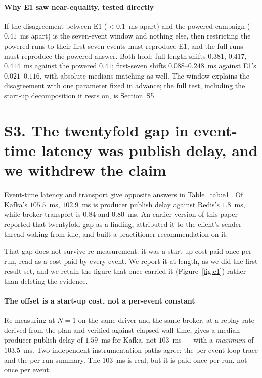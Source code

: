 \documentclass[10pt,journal,onecolumn]{IEEEtran}
\newcommand{\kafka}{Kafka}
\newcommand{\redis}{Redis}
\begin{document}
\paragraph{Why E1 saw near-equality, tested directly} If the disagreement between E1
($<0.1$~ms apart) and the powered campaign ($0.41$~ms apart) is the seven-event window and
nothing else, then restricting the powered runs to their first seven events must reproduce E1,
and the full runs must reproduce the powered answer. Both hold: full-length shifts $0.381$,
$0.417$, $0.414$~ms against the powered $0.41$; first-seven shifts $0.088$--$0.248$~ms against
E1's $0.021$--$0.116$, with absolute medians matching as well. The window explains the
disagreement with one parameter fixed in advance; the full test, including the start-up
decomposition it rests on, is Section~S5.


\section{S3. The twentyfold gap in event-time latency was publish delay, and we withdrew the claim}


Event-time latency and transport give opposite answers in Table~\ref{tab:e1}. Of \kafka{}'s $105.5$~ms,
$102.9$~ms is producer publish delay against \redis{}'s $1.8$~ms, while broker transport is
$0.84$ and $0.80$~ms. An earlier version of this paper reported that twentyfold gap as
a finding, attributed it to the client's sender thread waking from idle, and built a
practitioner recommendation on it.

That gap does not survive re-measurement: it was a start-up cost paid once per run, read as a
cost paid by every event. We report it at length, as we did the first result set, and we retain
the figure that once carried it (Figure~\ref{fig:e1}) rather than deleting the evidence.

\paragraph{The offset is a start-up cost, not a per-event constant} Re-measuring at $N{=}1$ on
the same driver and the same broker, at a replay rate derived from the plan and verified against
elapsed wall time, gives a median producer publish delay of $1.59$~ms for \kafka{}, not
$103$~ms --- with a \emph{maximum} of $103.5$~ms. Two independent instrumentation paths agree:
the per-event loop trace and the per-run summary. The $103$~ms is real, but it is paid once per
run, not once per event.
\end{document}

